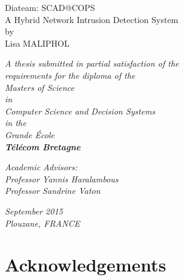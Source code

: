\documentclass[12pt,]{article}
\begin{document}
\begin{center}

\vspace{30mm}

{\Huge Diateam: SCAD@COPS}\\
\bigskip
{\Huge A Hybrid Network Intrusion Detection System}\\
\vspace{15mm}
{\Large by}\\

\vspace{18mm}
{\huge Lisa MALIPHOL}\\

\vspace{25mm}

\textit{A thesis submitted in partial satisfaction of the}\\
\medskip
\textit{requirements for the diploma of the}\\
\medskip
\textit{Masters of Science}\\
\medskip
\textit{in}\\
\medskip
\textit{Computer Science and Decision Systems}\\
\medskip
\textit{in the}\\
\medskip
\textit{Grande École}\\
\medskip
\textbf{\textit{\Large Télécom Bretagne}}\\

\vspace{10mm}

\textit{Academic Advisors:}\\
\medskip
\textit{Professor Yannis Haralambous}\\
\medskip
\textit{Professor Sandrine Vaton}\\

\vspace{15mm}

\textit{September 2015}\\
\medskip
\textit{Plouzane, FRANCE}\\

\end{center}

\thispagestyle{empty} \clearpage

\tableofcontents

\thispagestyle{empty} \newpage

\section*{Acknowledgements}\label{acknowledgements}
\end{document}
